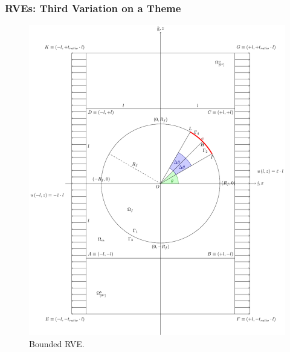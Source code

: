 \documentclass[first,firstsupp,lastsupp,handout,last,hyperref,table]{ETHclass}
\begin{document}
\begin{frame}
\frametitle{RVEs: Third Variation on a Theme}
\vspace{-0.25cm}
\centering
\begin{figure}
\centering
\includegraphics[height=0.7\textheight]{boundedRVE_cc.pdf}
\caption{\scriptsize Bounded RVE.}
\label{fig:boundedRVE}
\end{figure}
\end{frame}
\end{document}
